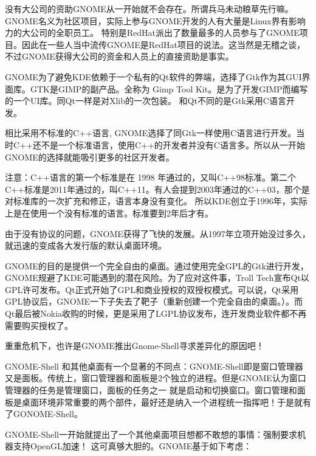 没有大公司的资助GNOME从一开始就不会存在。所谓兵马未动粮草先行嘛。GNOME名义为社区项目，实际上参与GNOME开发的人有大量是Linux界有影响力的大公司的全职员工。
特别是RedHat派出了数量最多的人员参与了GNOME项目。因此在一些人当中流传GNOME是RedHat项目的说法。这当然是无稽之谈，不过GNOME获得大公司的资金和人员上的直接资助是事实。

GNOME为了避免KDE依赖于一个私有的Qt软件的弊端，选择了Gtk作为其GUI界面库。GTK是GIMP的副产品。全称为 Gimp Tool Kit。是为了开发GIMP而编写的一个UI库。同Qt一样是对Xlib的一次包装。
和Qt不同的是Gtk采用C语言开发。

相比采用不标准的C++语言, GNOME选择了同Gtk一样使用C语言进行开发。当时C++还不是一个标准语言，使用C++的开发者并没有C语言多。所以从一开始GNOME的选择就能吸引更多的社区开发者。

\begin{notice}
注意：C++语言的第一个标准是在 1998 年通过的，又叫C++98标准。第二个C++标准是2011年通过的，叫C++11。有人会提到2003年通过的C++03，那个是对标准库的一次扩充和修正，语言本身没有变化。
所以KDE创立于1996年，实际上是在使用一个没有标准的语言。标准要到2年后才有。
\end{notice}

由于没有协议的问题，GNOME获得了飞快的发展。从1997年立项开始没过多久，就迅速的变成各大发行版的默认桌面环境。

GNOME的目的是提供一个完全自由的桌面。通过使用完全GPL的Gtk进行开发，GNOME规避了KDE可能遇到的潜在风险。为了应对这件事，Troll Tech宣布Qt以GPL许可发布。Qt正式开始了GPL和商业授权的双授权模式。可以说，Qt采用GPL协议后，GNOME一下子失去了靶子（重新创建一个完全自由的桌面。）。而Qt最后被Nokia收购的时候，更是采用了LGPL协议发布，连开发商业软件都不再需要购买授权了。

重重危机下，也许是GNOME推出Gnome-Shell寻求差异化的原因吧！

GNOME-Shell 和其他桌面有一个显著的不同点：GNOME-Shell即是窗口管理器又是面板。传统上，窗口管理器和面板是2个独立的进程。但是GNOME认为窗口管理器的任务是管理窗口，面板的任务之一
就是启动和切换窗口。窗口管理和面板是桌面环境非常重要的两个部件，最好还是纳入一个进程统一指挥吧！于是就有了GONOME-Shell。

GNOME-Shell一开始就提出了一个其他桌面项目想都不敢想的事情：强制要求机器支持OpenGL加速！ 这可真够大胆的。GNOME基于如下考虑：

